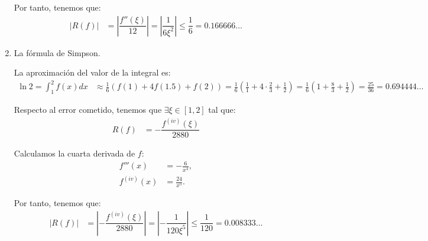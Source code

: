 \begin{ejercicio}
\begin{enumerate}
        Por tanto, tenemos que:
        \begin{align*}
            |R(f)| &= \left|\dfrac{f''(\xi)}{12} \right| = \left|\dfrac{1}{6\xi^2} \right| \leq \dfrac{1}{6} = 0.166666\ldots
        \end{align*}
        \item La fórmula de Simpson.
        
        La aproximación del valor de la integral es:
        \begin{align*}
            \ln 2 = \int_{1}^{2} f(x) dx &\approx \frac{1}{6} (f(1) + 4f(1.5) + f(2)) = \frac{1}{6} \left(\frac{1}{1} + 4\cdot \frac{2}{3} + \frac{1}{2}\right) = \frac{1}{6} \left(1 + \frac{8}{3} + \frac{1}{2}\right) = \frac{25}{36} = 0.694444\ldots
        \end{align*}

        Respecto al error cometido, tenemos que $\exists \xi \in [1, 2]$ tal que:
        \begin{align*}
            R(f) &= -\dfrac{f^{(iv)}(\xi)}{2880}
        \end{align*}

        Calculamos la cuarta derivada de $f$:
        \begin{align*}
            f'''(x) &= -\frac{6}{x^4},\\
            f^{(iv)}(x) &= \frac{24}{x^5}.
        \end{align*}

        Por tanto, tenemos que:
        \begin{align*}
            |R(f)| &= \left| -\dfrac{f^{(iv)}(\xi)}{2880} \right| = \left| -\dfrac{1}{120\xi^5} \right| \leq \dfrac{1}{120} = 0.008333\ldots
        \end{align*}

    \end{enumerate}
\end{ejercicio}

